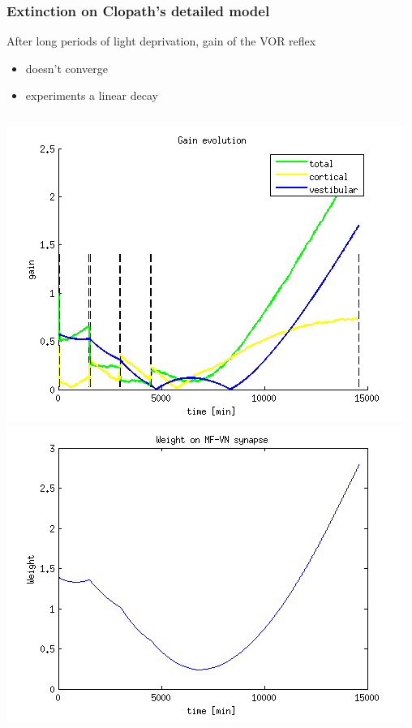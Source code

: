 \documentclass[10pt, compress]{beamer}
\begin{document}
\begin{frame}[fragile]
  \frametitle{Extinction on Clopath's detailed model}
  After long periods of light deprivation, gain of the VOR reflex
  \begin{itemize}
    \item doesn't converge
    \item experiments a linear decay
  \end{itemize}
  \begin{columns}[onlytextwidth]
      \includegraphics[scale=0.4]{../../simulations/parametric/html/longclopath_13.png}
      \includegraphics[scale=0.4]{../../simulations/parametric/html/longclopath_15.png}
  \end{columns}
\end{frame}
\end{document}

